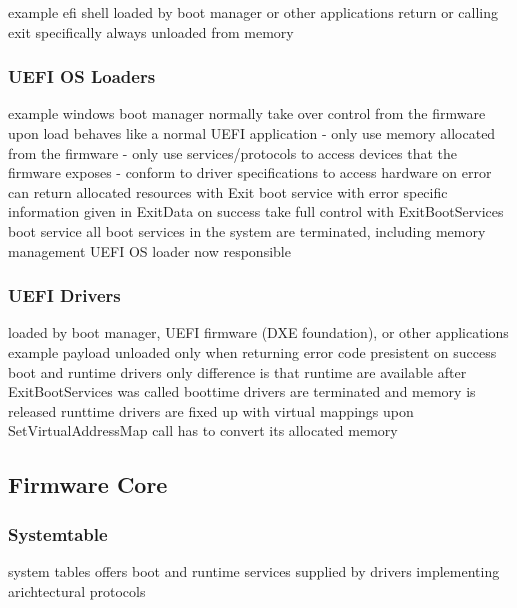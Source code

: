 example efi shell
loaded by boot manager or other applications
return or calling exit specifically
always unloaded from memory

\subsubsection{UEFI OS Loaders}


example windows boot manager
normally take over control from the firmware
upon load behaves like a normal UEFI application
- only use memory allocated from the firmware
- only use services/protocols to access devices that the firmware exposes
- conform to driver specifications to access hardware
on error can return allocated resources with Exit boot service with error specific information given in ExitData
on success take full control with ExitBootServices boot service
all boot services in the system are terminated, including memory management
UEFI OS loader now responsible

\subsubsection{UEFI Drivers}


loaded by boot manager, UEFI firmware (DXE foundation), or other applications
example payload
unloaded only when returning error code
presistent on success
boot and runtime drivers
only difference is that runtime are available after ExitBootServices was called
boottime drivers are terminated and memory is released
runttime drivers are fixed up with virtual mappings upon SetVirtualAddressMap call
has to convert its allocated memory

\subsection{Firmware Core}
\subsubsection{Systemtable}
system tables offers boot and runtime services
supplied by drivers implementing arichtectural protocols %
